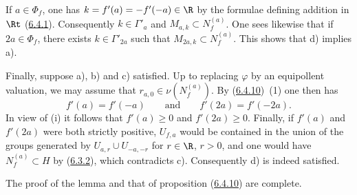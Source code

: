 \documentclass[12pt,a4paper,oneside,english]{smfart}
\newcommand{\btref}[1]{\hyperlink{bt:#1}{#1}}
\theoremstyle{definition}
\theoremstyle{bt}
\begin{document}
If $a\in\Phi_f$, one has $k=f'(a)=-f'(-a)\in\R$ by the formulae defining
addition in $\Rt$ (\btref{6.4.1}). Consequently $k\in\Gamma'_a$ and
$M_{a,k}\subset N_f^{(a)}$. One sees likewise that if $2a\in\Phi_f$, there
exists $k\in\Gamma'_{2a}$ such that $M_{2a,k}\subset N_f^{(a)}$. This shows
that d) implies a).

Finally, suppose a), b) and c) satisfied. Up to replacing $\varphi$ by an
equipollent valuation, we may assume that $r_{a,0}\in\nu(N_f^{(a)})$. By
(\btref{6.4.10})~(1) one then has
\[
  f'(a)=f'(-a)\qquad\text{and}\qquad f'(2a)=f'(-2a).
\]
In view of (i) it follows that $f'(a)\geq0$ and $f'(2a)\geq0$. Finally, if
$f'(a)$ and $f'(2a)$ were both strictly positive, $U_{f,a}$ would be
contained in the union of the groups generated by
$U_{a,r}\cup U_{-a,-r}$ for $r\in\R$, $r>0$, and one would have
$N_f^{(a)}\subset H$ by (\btref{6.3.2}), which contradicts c). Consequently d) is
indeed satisfied.

The proof of the lemma and that of proposition (\btref{6.4.10}) are complete.
\end{document}

